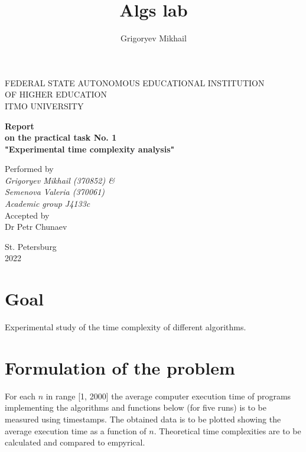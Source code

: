 \documentclass[12pt, a4paper]{article}
\author{Grigoryev Mikhail}
\title{Algs lab}
\begin{document}
\thispagestyle{empty}

\vspace{30mm}

\begin{center}
FEDERAL STATE AUTONOMOUS EDUCATIONAL INSTITUTION \\
OF HIGHER EDUCATION \\
ITMO UNIVERSITY

\vspace{40mm}

{\large \textbf{Report \\
on the practical task No. 1 \\
"Experimental time complexity analysis"}}
\end{center}

\vspace{15mm}

\begin{flushright}
{\large Performed by \\
\textit{Grigoryev Mikhail (370852) \& \\
Semenova Valeria (370061) \\
Academic group J4133c \\}
Accepted by \\
Dr Petr Chunaev}
\end{flushright}

\vspace{100mm}

\begin{center}
St. Petersburg \\
2022
\end{center}

\newpage

\section*{Goal}

Experimental study of the time complexity of different algorithms.

\section*{Formulation of the problem}

For each $n$ in range [1, 2000] the average computer execution time of programs implementing the algorithms and functions below (for five runs) is to be measured using timestamps. The obtained data is to be plotted showing the average execution time as a function of $n$. Theoretical time complexities are to be calculated and compared to empyrical.
\end{document}

